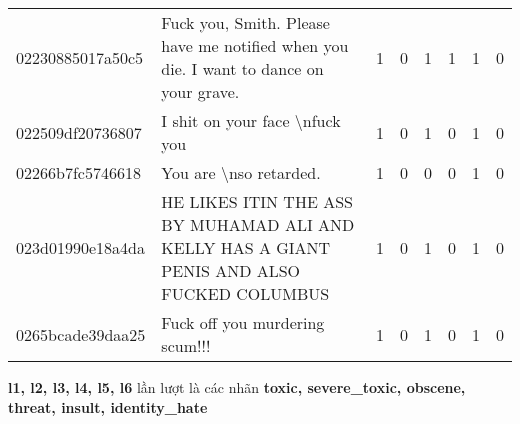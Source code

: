 \begin{center}
\begin{sidewaystable}[htb]
\begin{tabularx}{\textwidth}{L{0.8} L{6.6} C{0.1} C{0.1} C{0.1} C{0.1} C{0.1} C{0.1}}
            02230885017a50c5 & Fuck you, Smith. Please have me notified when you die. I want to dance on your grave.                                            & 1           & 0           & 1           & 1           & 1           & 0           \\
            022509df20736807 & I shit on your face \textbackslash nfuck you                                                                                     & 1           & 0           & 1           & 0           & 1           & 0           \\
            02266b7fc5746618 & You are \textbackslash nso retarded.                                                                                             & 1           & 0           & 0           & 0           & 1           & 0           \\
            023d01990e18a4da & HE LIKES ITIN THE ASS BY MUHAMAD ALI AND KELLY HAS A GIANT PENIS AND ALSO FUCKED COLUMBUS                                        & 1           & 0           & 1           & 0           & 1           & 0           \\
            0265bcade39daa25 & Fuck off you murdering scum!!!                                                                                                   & 1           & 0           & 1           & 0           & 1           & 0           \\
            \bottomrule
        \end{tabularx}
        {
        \fontsize{8pt}{12pt}\selectfont
        \textbf{l1, l2, l3, l4, l5, l6} lần lượt là các nhãn \textbf{toxic, severe\_toxic, obscene, threat, insult, identity\_hate}
        }
    \end{sidewaystable}
\end{center}

